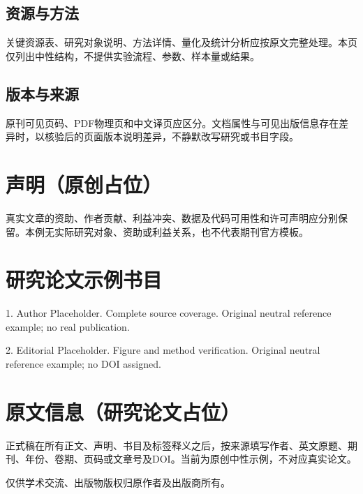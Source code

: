 \subsection*{资源与方法}
关键资源表、研究对象说明、方法详情、量化及统计分析应按原文完整处理。本页仅列出中性结构，不提供实验流程、参数、样本量或结果。

\subsection*{版本与来源}
原刊可见页码、PDF物理页和中文译页应区分。文档属性与可见出版信息存在差异时，以核验后的页面版本说明差异，不静默改写研究或书目字段。

\section*{声明（原创占位）}
真实文章的资助、作者贡献、利益冲突、数据及代码可用性和许可声明应分别保留。本例无实际研究对象、资助或利益关系，也不代表期刊官方模板。

\section*{研究论文示例书目}
{\fontsize{7.6bp}{9.6bp}\selectfont\noindent
\hypertarget{cell-article-ref:1}{1.} Author Placeholder. Complete source coverage. Original neutral reference example; no real publication.\par\smallskip
\noindent\hypertarget{cell-article-ref:2}{2.} Editorial Placeholder. Figure and method verification. Original neutral reference example; no DOI assigned.\par}

\section*{原文信息（研究论文占位）}
正式稿在所有正文、声明、书目及标签释义之后，按来源填写作者、英文原题、期刊、年份、卷期、页码或文章号及DOI。当前为原创中性示例，不对应真实论文。\par
仅供学术交流、出版物版权归原作者及出版商所有。
